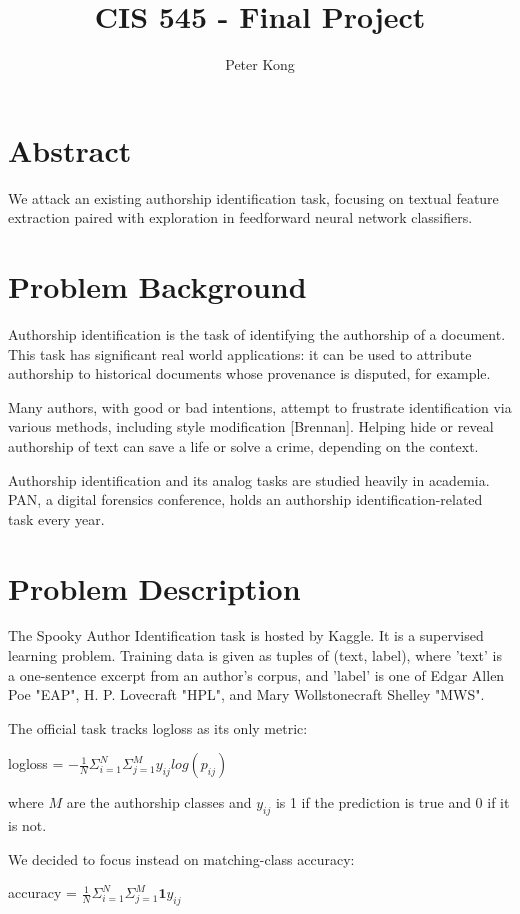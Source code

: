 \documentclass[8pt]{article}
\title{CIS 545 - Final Project}
\author{Peter Kong}
\begin{document}
\maketitle


\section{Abstract} We attack an existing authorship identification task, focusing on textual feature extraction paired with exploration in feedforward neural network classifiers.

\section{Problem Background}
Authorship identification is the task of identifying the authorship of a document. This task has significant real world applications: it can be used to attribute authorship to historical documents whose provenance is disputed, for example.

Many authors, with good or bad intentions, attempt to frustrate identification via various methods, including style modification [Brennan]. Helping hide or reveal authorship of text can save a life or solve a crime, depending on the context.

Authorship identification and its analog tasks are studied heavily in academia. PAN, a digital forensics conference, holds an authorship identification-related task every year. 


\section{Problem Description}
The Spooky Author Identification task is hosted by Kaggle. It is a supervised learning problem. Training data is given as tuples of (text, label), where 'text' is a one-sentence excerpt from an author's corpus, and 'label' is one of Edgar Allen Poe "EAP", H. P. Lovecraft "HPL", and Mary Wollstonecraft Shelley "MWS".

The official task tracks logloss as its only metric:
\vskip 0.3in
\centerline{logloss = $-\frac{1}{N}\Sigma^N_{i=1}\Sigma^M_{j=1}y_{ij}log(p_{ij})$} 

where $M$ are the authorship classes and $y_{ij}$ is 1 if the prediction is true and 0 if it is not.

We decided to focus instead on matching-class accuracy: 
\vskip 0.3in
\centerline{accuracy = $\frac{1}{N}\Sigma^N_{i=1}\Sigma^M_{j=1}\textbf{1}y_{ij}$}
\end{document}
